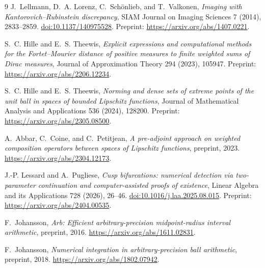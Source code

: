\clearpage
\begin{thebibliography}{9}
J.~Lellmann, D.~A. Lorenz, C.~Sch\"onlieb, and T.~Valkonen,
\emph{Imaging with Kantorovich--Rubinstein discrepancy},
SIAM Journal on Imaging Sciences 7 (2014), 2833--2859.
\href{https://doi.org/10.1137/140975528}{doi:10.1137/140975528}.
Preprint: \url{https://arxiv.org/abs/1407.0221}.

S.~C. Hille and E.~S. Theewis,
\emph{Explicit expressions and computational methods for the
Fortet--Mourier distance of positive measures to finite weighted sums of
Dirac measures}, Journal of Approximation Theory 294 (2023), 105947.
Preprint:
\url{https://arxiv.org/abs/2206.12234}.

S.~C. Hille and E.~S. Theewis,
\emph{Norming and dense sets of extreme points of the unit ball in
spaces of bounded Lipschitz functions},
Journal of Mathematical Analysis and Applications 536 (2024), 128200.
Preprint:
\url{https://arxiv.org/abs/2305.08500}.

A.~Abbar, C.~Coine, and C.~Petitjean,
\emph{A pre-adjoint approach on weighted composition operators between
spaces of Lipschitz functions}, preprint, 2023.
\url{https://arxiv.org/abs/2304.12173}.

J.-P. Lessard and A.~Pugliese,
\emph{Cusp bifurcations: numerical detection via two-parameter
continuation and computer-assisted proofs of existence},
Linear Algebra and its Applications 728 (2026), 26--46.
\href{https://doi.org/10.1016/j.laa.2025.08.015}{doi:10.1016/j.laa.2025.08.015}.
Preprint: \url{https://arxiv.org/abs/2404.00535}.

F.~Johansson,
\emph{Arb: Efficient arbitrary-precision midpoint-radius interval arithmetic},
preprint, 2016.
\url{https://arxiv.org/abs/1611.02831}.

F.~Johansson,
\emph{Numerical integration in arbitrary-precision ball arithmetic},
preprint, 2018.
\url{https://arxiv.org/abs/1802.07942}.
\end{thebibliography}
